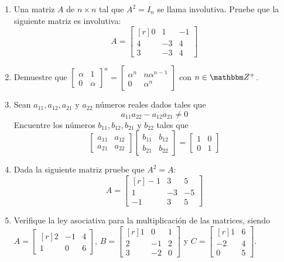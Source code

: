 \begin{enumerate}[start=36]
    \item Una matriz $A$ de $n \times n$ tal que $A^{2}=I_{n}$ se llama involutiva. Pruebe que la siguiente matriz es involutiva:
    $$
    A=\begin{bmatrix*}[r]
    0 & 1 & -1 \\
    4 & -3 & 4 \\
    3 & -3 & 4
    \end{bmatrix*}
    $$
    \item Demuestre que $\begin{bmatrix*}\alpha & 1 \\ 0 & \alpha\end{bmatrix*}^{n}=\begin{bmatrix*}\alpha^{n} & n \alpha^{n-1} \\ 0 & \alpha^{n}\end{bmatrix*}$ con $n \in \ZZ[+]$.
    \item Sean $a_{11}, a_{12}, a_{21}$ y $a_{22}$ números reales dados tales que
    $$a_{11} a_{22}-a_{12} a_{21} \neq 0$$
    Encuentre los números $b_{11}, b_{12}, b_{21}$ y $b_{22}$ tales que
    $$\begin{bmatrix*}a_{11} & a_{12} \\ a_{21} & a_{22}\end{bmatrix*}\begin{bmatrix*}b_{11} & b_{12} \\ b_{21} & b_{22}\end{bmatrix*}=\begin{bmatrix*}1 & 0 \\ 0 & 1\end{bmatrix*}$$
    \item Dada la siguiente matriz pruebe que $A^{2}=A$:
    $$
    A=\begin{bmatrix*}[r]
    -1 & 3 & 5 \\
    1 & -3 & -5 \\
    -1 & 3 & 5
    \end{bmatrix*}
    $$
    \item Verifique la ley asociativa para la multiplicación de las matrices, siendo $A=\begin{bmatrix*}[r]2 & -1 & 4 \\ 1 & 0 & 6\end{bmatrix*}$, $B=\begin{bmatrix*}[r]1 & 0 & 1 \\ 2 & -1 & 2 \\ 3 & -2 & 0\end{bmatrix*}$ y $C=\begin{bmatrix*}[r]1 & 6 \\ -2 & 4 \\ 0 & 5\end{bmatrix*}$.
\end{enumerate}
